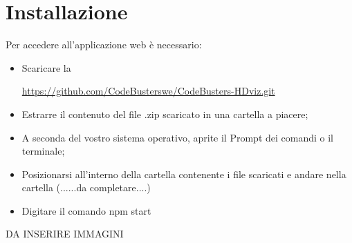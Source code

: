 \section{Installazione}
Per accedere all'applicazione web è necessario:
\begin{itemize}
	\item Scaricare la 
	\begin{center}
		\textcolor{blue}{\url{https://github.com/CodeBusterswe/CodeBusters-HDviz.git}}
	\end{center}
	
	\item Estrarre il contenuto del file .zip scaricato in una cartella a piacere;
	
	\item A seconda del vostro sistema operativo, aprite il Prompt dei comandi o il terminale;
	
	\item Posizionarsi all'interno della cartella contenente i file scaricati e andare nella cartella (......da completare....)
	
	\item Digitare il comando {\selectfont
npm start
}
	
\end{itemize}



DA INSERIRE IMMAGINI